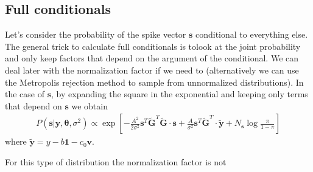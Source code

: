\documentclass{article}
\theoremstyle{remark}
\begin{document}
\subsection{Full conditionals}
Let's consider the probability of the spike vector $\bm{s}$ conditional to everything else. The general trick to calculate full conditionals is tolook at the joint probability and only keep factors that depend on the argument of the conditional. We can deal later with the normalization factor if we need to (alternatively we can use the Metropolis rejection method to sample from unnormalized distributions). In the case of $\bm{s}$, by expanding the square in the exponential and keeping only terms that depend on $\bm{s}$ we obtain
\begin{align}
    P(\bm{s}|\bm{y},\bm{\theta},\sigma^2) \propto \exp\left[-\frac{A^2}{2\sigma^2}\bm{s}^T\bm{\tilde G}^T\bm{\tilde G}\cdot \bm{s}+\frac{A}{\sigma^2}\bm{s}^T\bm{\tilde G}^T\cdot\bm{\tilde y}+N_{\bm{s}}\log\frac{\pi}{1-\pi}\right]
\end{align}
where $\bm{\tilde y}=y-b\bm{1}-c_0\bm{v}$. 

For this type of distribution the normalization factor is not
\end{document}
